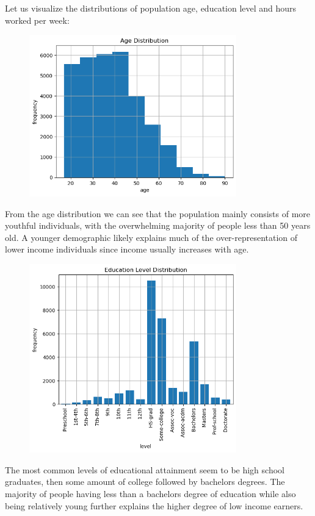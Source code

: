 \documentclass{article}
\begin{document}
    \begin{center}
        \begin{minipage}[t]{0.9\textwidth}
            Let us visualize the distributions of population age, education level and hours worked per week:
            \begin{figure}[H]
                \centering
                \includegraphics[width=0.8\textwidth, height=0.3\textheight]{./1_4a.png}
            \end{figure}
            From the age distribution we can see that the population mainly consists of more
            youthful individuals, with the overwhelming majority of people less than 50 years old.
            A younger demographic likely explains much of the over-representation of lower
            income individuals since income usually increases with age.
            \begin{figure}[H]
                \centering
                \includegraphics[width=0.8\textwidth, height=0.4\textheight]{./1_4b.png}
            \end{figure}
            The most common levels of educational attainment seem to be high school graduates,
            then some amount of college followed by bachelors degrees. The majority of people
            having less than a bachelors degree of education while also being relatively young
            further explains the higher degree of low income earners. 
        \end{minipage}
    \end{center}
\end{document}
